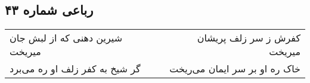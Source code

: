 \begin{center}
\section*{رباعی شماره ۴۳}
\label{sec:sh043}
\begin{longtable}{l p{0.5cm} r}
شیرین دهنی که از لبش جان میریخت
&&
کفرش ز سر زلف پریشان میریخت
\\
گر شیخ به کفر زلف او ره می‌برد
&&
خاک ره او بر سر ایمان می‌ریخت
\\
\end{longtable}
\end{center}
